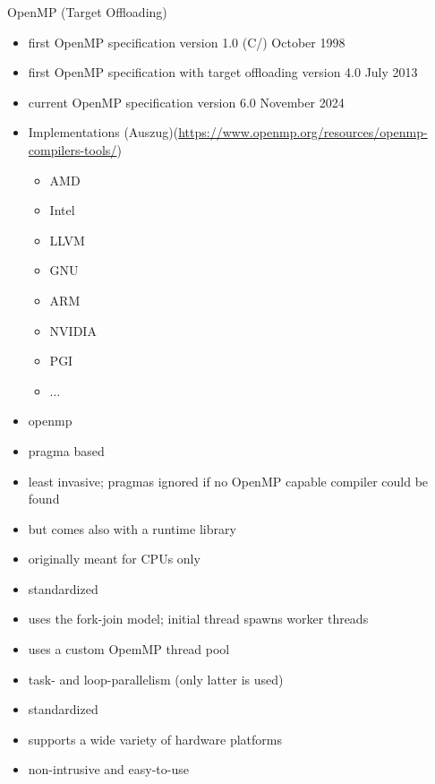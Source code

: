 OpenMP (Target Offloading)
\begin{itemize}
    \item first OpenMP specification version 1.0 (C/\cpp) October 1998~\cite{openmp_architecture_review_board_openmp_1998}
    \item first OpenMP specification with target offloading version 4.0 July 2013~\cite{openmp_architecture_review_board_openmp_2013}
    \item current OpenMP specification version 6.0 November 2024~\cite{openmp_architecture_review_board_openmp_2024}
    \item Implementations (Auszug)(\url{https://www.openmp.org/resources/openmp-compilers-tools/})
    \begin{itemize}
        \item AMD
        \item Intel
        \item LLVM
        \item GNU
        \item ARM
        \item NVIDIA
        \item PGI
        \item $\dots$
    \end{itemize}
\end{itemize}


\begin{itemize}
    \item \acrfull{openmp}
    \item pragma based
    \item least invasive; pragmas ignored if no OpenMP capable compiler could be found
    \item but comes also with a runtime library 
    \item originally meant for CPUs only
    \item standardized
    \item uses the fork-join model; initial thread spawns worker threads
    \item uses a custom OpemMP thread pool
    \item task- and loop-parallelism (only latter is used)
\end{itemize}


\begin{advantagebox}
    \begin{itemize}
        \item standardized
        \item supports a wide variety of hardware platforms
        \item non-intrusive and easy-to-use
    \end{itemize}
\end{advantagebox}

